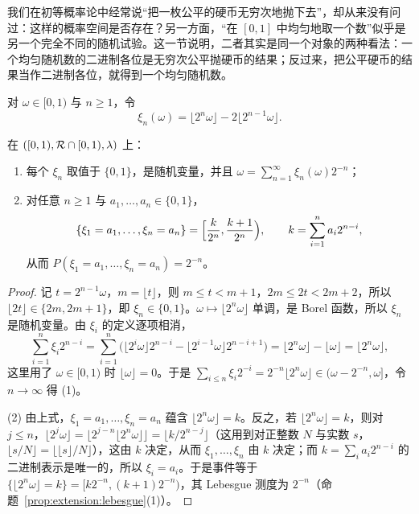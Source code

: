 我们在初等概率论中经常说“把一枚公平的硬币无穷次地抛下去”，却从来没有问过：这样的概率空间是否存在？另一方面，“在 $[0,1]$ 中均匀地取一个数”似乎是另一个完全不同的随机试验。这一节说明，二者其实是同一个对象的两种看法：一个均匀随机数的二进制各位是无穷次公平抛硬币的结果；反过来，把公平硬币的结果当作二进制各位，就得到一个均匀随机数。

对 $\omega\in[0,1)$ 与 $n\geqslant1$，令
\[
\xi_n(\omega)=\lfloor2^n\omega\rfloor-2\lfloor2^{n-1}\omega\rfloor .
\]

\begin{proposition}[均匀随机数的二进制各位]\label{prop:distributions:binary-digits}
在 $([0,1),\mathcal{R}\cap[0,1),\lambda)$ 上：
\begin{enumerate}
\item 每个 $\xi_n$ 取值于 $\{0,1\}$，是随机变量，并且 $\omega=\sum_{n=1}^\infty\xi_n(\omega)2^{-n}$；
\item 对任意 $n\geqslant1$ 与 $a_1,\dots,a_n\in\{0,1\}$，
\[
\{\xi_1=a_1,\dots,\xi_n=a_n\}=\Bigl[\frac k{2^n},\frac{k+1}{2^n}\Bigr),\qquad k=\sum_{i=1}^na_i2^{n-i},
\]
从而 $P(\xi_1=a_1,\dots,\xi_n=a_n)=2^{-n}$。
\end{enumerate}
\end{proposition}
\begin{proof}
记 $t=2^{n-1}\omega$，$m=\lfloor t\rfloor$，则 $m\leqslant t<m+1$，$2m\leqslant2t<2m+2$，所以 $\lfloor2t\rfloor\in\{2m,2m+1\}$，即 $\xi_n\in\{0,1\}$。$\omega\mapsto\lfloor2^n\omega\rfloor$ 单调，是 Borel 函数，所以 $\xi_n$ 是随机变量。由 $\xi_i$ 的定义逐项相消，
\[
\sum_{i=1}^n\xi_i2^{n-i}=\sum_{i=1}^n\bigl(\lfloor2^i\omega\rfloor2^{n-i}-\lfloor2^{i-1}\omega\rfloor2^{n-i+1}\bigr)=\lfloor2^n\omega\rfloor-\lfloor\omega\rfloor=\lfloor2^n\omega\rfloor,
\]
这里用了 $\omega\in[0,1)$ 时 $\lfloor\omega\rfloor=0$。于是 $\sum_{i\leqslant n}\xi_i2^{-i}=2^{-n}\lfloor2^n\omega\rfloor\in(\omega-2^{-n},\omega]$，令 $n\to\infty$ 得 (1)。

(2) 由上式，$\xi_1=a_1,\dots,\xi_n=a_n$ 蕴含 $\lfloor2^n\omega\rfloor=k$。反之，若 $\lfloor2^n\omega\rfloor=k$，则对 $j\leqslant n$，$\lfloor2^j\omega\rfloor=\lfloor2^{j-n}\lfloor2^n\omega\rfloor\rfloor=\lfloor k/2^{n-j}\rfloor$（这用到对正整数 $N$ 与实数 $s$，$\lfloor s/N\rfloor=\lfloor\lfloor s\rfloor/N\rfloor$），这由 $k$ 决定，从而 $\xi_1,\dots,\xi_n$ 由 $k$ 决定；而 $k=\sum_ia_i2^{n-i}$ 的二进制表示是唯一的，所以 $\xi_i=a_i$。于是事件等于 $\{\lfloor2^n\omega\rfloor=k\}=[k2^{-n},(k+1)2^{-n})$，其 Lebesgue 测度为 $2^{-n}$（命题~\ref{prop:extension:lebesgue}(1)）。
\end{proof}

